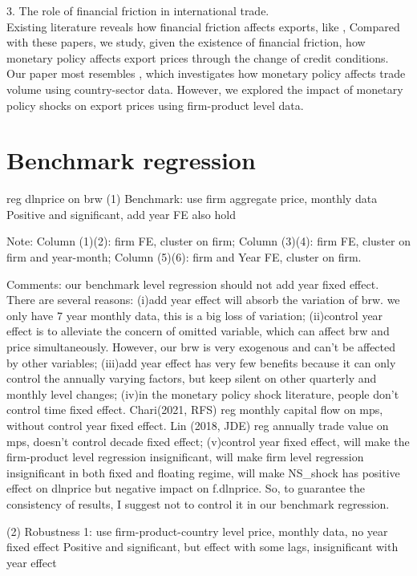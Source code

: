 \documentclass[12pt]{article}
\begin{document}
3. The role of financial friction in international trade.\\
Existing literature reveals how financial friction affects exports, like \cite{manova2013}, Compared with these papers, we study, given the existence of financial friction, how monetary policy affects export prices through the change of credit conditions. Our paper most resembles \cite{lin2018international}, which investigates how monetary policy affects trade volume using country-sector data. However, we explored the impact of monetary policy shocks on export prices using firm-product level data.







\section{Benchmark regression}

reg dlnprice on brw
(1) Benchmark: use firm aggregate price, monthly data
Positive and significant, add year FE also hold
 
Note: Column (1)(2): firm FE, cluster on firm; Column (3)(4): firm FE, cluster on firm and year-month; Column (5)(6): firm and Year FE, cluster on firm.

Comments: our benchmark level regression should not add year fixed effect. There are several reasons: (i)add year effect will absorb the variation of brw. we only have 7 year monthly data, this is a big loss of variation; (ii)control year effect is to alleviate the concern of omitted variable, which can affect brw and price simultaneously. However, our brw is very exogenous and can’t be affected by other variables; (iii)add year effect has very few benefits because it can only control the annually varying factors, but keep silent on other quarterly and monthly level changes; (iv)in the monetary policy shock literature, people don’t control time fixed effect. Chari(2021, RFS) reg monthly capital flow on mps, without control year fixed effect. Lin (2018, JDE) reg annually trade value on mps, doesn’t control decade fixed effect; (v)control year fixed effect, will make the firm-product level regression insignificant, will make firm level regression insignificant in both fixed and floating regime, will make NS_shock has positive effect on dlnprice but negative impact on f.dlnprice. So, to guarantee the consistency of results, I suggest not to control it in our benchmark regression.

(2) Robustness 1: use firm-product-country level price, monthly data, no year fixed effect
Positive and significant, but effect with some lags, insignificant with year effect
\end{document}
